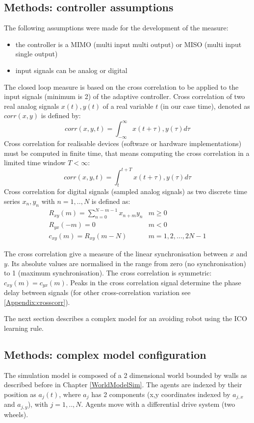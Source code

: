 \subsection{Methods: controller assumptions}
The following assumptions were made for the development of the measure:
\begin{itemize}
\item the controller is a MIMO (multi input multi output) or MISO (multi input single output)
\item input signals can be analog or digital
\end{itemize}

The closed loop measure is based on the cross correlation to be applied to the
input signals (minimum is 2) of the adaptive controller.
Cross correlation of two real analog signals $x(t),y(t)$ of a real variable $t$
(in our case time), denoted as $corr(x,y)$ is defined by:
\begin{equation}
corr(x,y,t)=\int_{-\infty}^\infty x(t+\tau),y(\tau)d\tau
\end{equation}
Cross correlation for realisable devices (software or hardware implementations)
must be computed in finite time, that means computing the cross correlation
in a limited time window $T<\infty$:
\begin{equation}
corr(x,y,t)=\int_{t}^{t+T} x(t+\tau),y(\tau)d\tau
\end{equation}
Cross correlation for digital signals (sampled analog signals) as two discrete
time series $x_{n},y_{n}$ with $n=1,..,N$ is defined as:
 \begin{eqnarray}
 R_{xy}(m)=\sum_{n=0}^{N-m-1}x_{n+m}y_{n} & m \geq 0 \\
 R_{yx}(-m)=0 & m <0\\
 c_{xy}(m)=R_{xy}(m-N) & m=1,2,...,2N-1\label{eq:xcorrdigital}
\end{eqnarray}

The cross correlation give a measure of the linear synchronisation between $x$ and $y$.
Its absolute values are normalised in the range from zero (no synchronisation) to 1 (maximum synchronisation).
The cross correlation is symmetric: $c_{xy}(m)=c_{yx}(m)$.
Peaks in the cross correlation signal determine
the phase delay between signals (for other cross-correlation variation see \ref{Appendix:crosscorr}).

The next section describes a complex model for an avoiding robot using the ICO
learning rule.

\subsection{Methods: complex model configuration}
The simulation model is composed of a 2 dimensional world bounded by walls
as described before in Chapter \ref{WorldModelSim}.
The agents are indexed by their position as $a_{j}(t)$, where $a_{j}$
has 2 components (x,y coordinates indexed by $a_{j,x}$ and $a_{j,y}$),
with $j=1,..,N$. Agents move with a differential drive system (two wheels).

